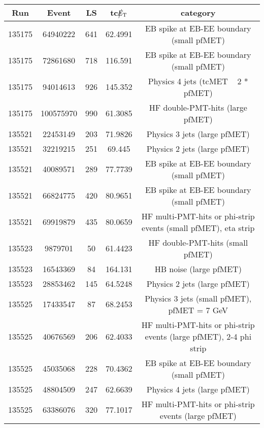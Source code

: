 \begin{table}[htbp]
  \begin{center}
    \begin{tabular}{|c|c|c|c|c|}
      \hline
      Run & Event & LS & tc$\big\slash\hspace{-1.6ex}{E_\text{T}}$ & category \\     
      \hline
      135175  & 64940222     & 641  &    62.4991 & EB spike at EB-EE boundary (small pfMET) \\
      135175  & 72861680     & 718  &    116.591 & EB spike at EB-EE boundary (small pfMET) \\
      135175  & 94014613     & 926  &    145.352 & Physics 4 jets (tcMET ~ 2 * pfMET) \\
      135175  & 100575970    & 990  &    61.3085 & HF double-PMT-hits (large pfMET) \\
      135521  & 22453149     & 203  &    71.9826 & Physics 3 jets (large pfMET) \\
      135521  & 32219215     & 251  &    69.445  & Physics 2 jets (large pfMET) \\
      135521  & 40089571     & 289  &    77.7739 & EB spike at EB-EE boundary (small pfMET) \\
      135521  & 66824775     & 420  &    80.9651 & EB spike at EB-EE boundary (small pfMET) \\
      135521  & 69919879     & 435  &    80.0659 & HF multi-PMT-hits or phi-strip events (small pfMET), eta strip \\
      135523  & 9879701      & 50   &    61.4423 & HF double-PMT-hits (small pfMET) \\
      135523  & 16543369     & 84   &    164.131 & HB noise (large pfMET) \\
      135523  & 28853462     & 145  &    64.5248 & Physics 2 jets (large pfMET) \\
      135525  & 17433547     & 87   &    68.2453 & Physics 3 jets (small pfMET), pfMET = 7 GeV \\ 
      135525  & 40676569     & 206  &    62.4033 & HF multi-PMT-hits or phi-strip events (large pfMET), 2-4 phi strip \\
      135525  & 45035068     & 228  &    70.4362 & EB spike at EB-EE boundary (small pfMET) \\
      135525  & 48804509     & 247  &    62.6639 & Physics 4 jets (large pfMET) \\
      135525  & 63386076     & 320  &    77.1017 & HF multi-PMT-hits or phi-strip events (large pfMET) \\

\end{tabular}
\end{center}
\end{table}
